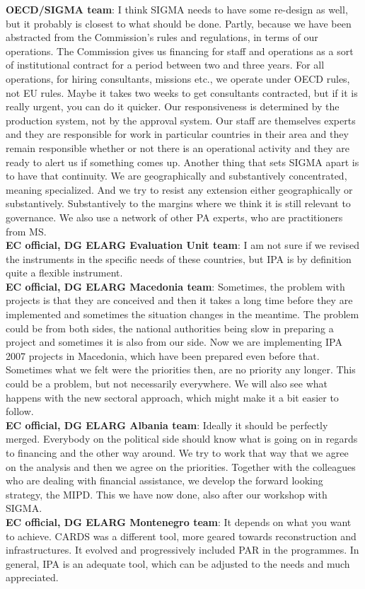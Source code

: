 \textbf{OECD/SIGMA team}: I think SIGMA needs to have some re-design as well, but it probably is closest to what should be done. Partly, because we have been abstracted from the Commission's rules and regulations, in terms of our operations. The Commission gives us financing for staff and operations as a sort of institutional contract for a period between two and three years. For all operations, for hiring consultants, missions etc., we operate under OECD rules, not EU rules. Maybe it takes two weeks to get consultants contracted, but if it is really urgent, you can do it quicker. Our responsiveness is determined by the production system, not by the approval system. Our staff are themselves experts and they are responsible for work in particular countries in their area and they remain responsible whether or not there is an operational activity and they are ready to alert us if something comes up. Another thing that sets SIGMA apart is to have that continuity. We are geographically and substantively concentrated, meaning specialized. And we try to resist any extension either geographically or substantively. Substantively to the margins where we think it is still relevant to governance. We also use a network of other PA experts, who are practitioners from MS.\\
\textbf{EC official, DG ELARG Evaluation Unit team}: I am not sure if we revised the instruments in the specific needs of these countries, but IPA is by definition quite a flexible instrument.\\
\textbf{EC official, DG ELARG Macedonia team}: Sometimes, the problem with projects is that they are conceived and then it takes a long time before they are implemented and sometimes the situation changes in the meantime. The problem could be from both sides, the national authorities being slow in preparing a project and sometimes it is also from our side. Now we are implementing IPA 2007 projects in Macedonia, which have been prepared even before that. Sometimes what we felt were the priorities then, are no priority any longer. This could be a problem, but not necessarily everywhere. We will also see what happens with the new sectoral approach, which might make it a bit easier to follow.\\
\textbf{EC official, DG ELARG Albania team}: Ideally it should be perfectly merged. Everybody on the political side should know what is going on in regards to financing and the other way around. We try to work that way that we agree on the analysis and then we agree on the priorities. Together with the colleagues who are dealing with financial assistance, we develop the forward looking strategy, the MIPD. This we have now done, also after our workshop with SIGMA.\\
\textbf{EC official, DG ELARG Montenegro team}: It depends on what you want to achieve. CARDS was a different tool, more geared towards reconstruction and infrastructures. It evolved and progressively included PAR in the programmes.  In general, IPA is an adequate tool, which can be adjusted to the needs and much appreciated.\\

